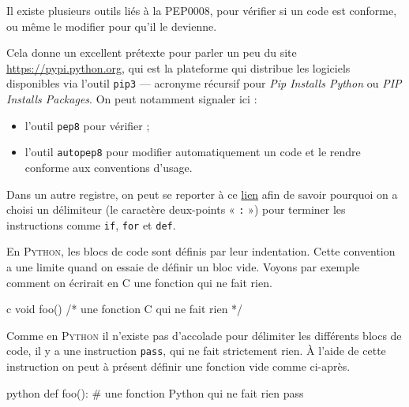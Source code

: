 Il existe plusieurs outils liés à la PEP0008, pour vérifier si un code est conforme, ou même le modifier pour qu'il le devienne.

Cela donne un excellent prétexte pour parler un peu du site \url{https://pypi.python.org}, qui est la plateforme qui distribue les logiciels disponibles via l'outil \texttt{pip3} --- acronyme récursif pour \textit{Pip Installs Python} ou \textit{PIP Installs Packages}. On peut notamment signaler ici :
\begin{itemize}
\item l'outil \texttt{pep8} pour vérifier ;
\item l'outil \texttt{autopep8} pour modifier automatiquement un code et le rendre conforme aux conventions d'usage.
\end{itemize}

Dans un autre registre, on peut se reporter à ce \href{https://docs.python.org/3/faq/design.html\#why-are-colons-required-for-the-if-while-def-class-statements}{lien} afin de savoir pourquoi on a choisi un délimiteur (le caractère deux-points « \texttt{:} ») pour terminer les instructions comme \texttt{if}, \texttt{for} et \texttt{def}.


En \textsc{Python}, les blocs de code sont définis par leur indentation. Cette convention a une limite quand on essaie de définir un bloc vide. Voyons par exemple comment on écrirait en C une fonction qui ne fait rien.

\vspace{-2pt}%

\begin{codebox}{c}
void foo() {} /* une fonction C qui ne fait rien */
\end{codebox}

Comme en \textsc{Python} il n'existe pas d'accolade pour délimiter les différents blocs de code, il y a une instruction \texttt{pass}, qui ne fait strictement rien. À l'aide de cette instruction on peut à présent définir une fonction vide comme ci-après.

\vspace{-4pt}%

\begin{codebox}{python}
def foo(): # une fonction Python qui ne fait rien
    pass
\end{codebox}

